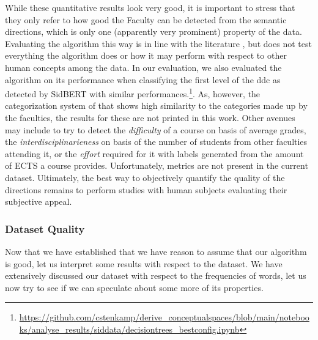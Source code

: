 
While these quantitative results look very good, it is important to stress that they only refer to how good the Faculty can be detected from the semantic directions, which is only one (apparently very prominent) property of the data. Evaluating the algorithm this way is in line with the literature \mainalgos, but does not test everything the algorithm does or how it may perform with respect to other human concepts among the data. In our evaluation, we also evaluated the algorithm on its performance when classifying the first level of the \gls{ddc} as detected by SidBERT with similar performances.\footnote{\url{https://github.com/cstenkamp/derive_conceptualspaces/blob/main/notebooks/analyse_results/siddata/decisiontrees_bestconfig.ipynb}}. As, however, the categorization system of that shows high similarity to the categories made up by the faculties, the results for these are not printed in this work. Other avenues may include to try to detect the \textit{difficulty} of a course on basis of average grades, the \textit{interdisciplinarieness} on basis of the number of students from other faculties attending it, or the \textit{effort} required for it with labels generated from the amount of ECTS a course provides. Unfortunately, metrics are not present in the current dataset. Ultimately, the best way to objectively quantify the quality of the directions remains to perform studies with human subjects evaluating their subjective appeal.

\subsubsection{Dataset Quality}

Now that we have established that we have reason to assume that our algorithm is good, let us interpret some results with respect to the dataset. We have extensively discussed our dataset with respect to the frequencies of words, let us now try to see if we can speculate about some more of its properties.


